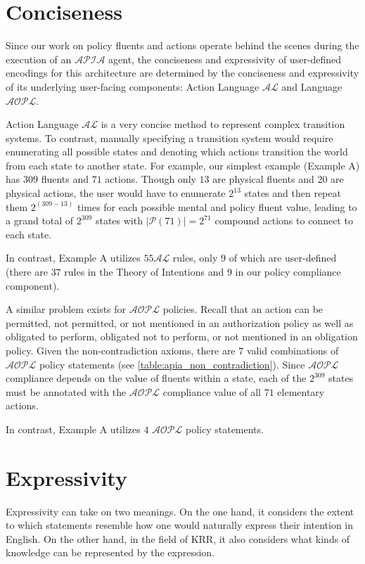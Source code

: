 \section{Conciseness}

Since our work on policy fluents and actions operate behind the scenes during the execution of an $\mathcal{APIA}$ agent, the conciseness and expressivity of user-defined encodings for this architecture are determined by the conciseness and expressivity of its underlying user-facing components: Action Language $\mathcal{AL}$ and Language $\mathcal{AOPL}$.

Action Language $\mathcal{AL}$ is a very concise method to represent complex transition systems.
To contrast, manually specifying a transition system would require enumerating all possible states and denoting which actions transition the world from each state to another state.
For example, our simplest example (Example A) has $309$ fluents and $71$ actions.
Though only $13$ are physical fluents and $20$ are physical actions, the user would have to enumerate $2^{13}$ states and then repeat them $2^{(309-13)}$ times for each possible mental and policy fluent value, leading to a grand total of $2^{309}$ states with $|\mathcal{P}(71)|=2^{71}$ compound actions to connect to each state.

In contrast, Example A utilizes $55$$\mathcal{AL}$ rules, only $9$ of which are user-defined (there are $37$ rules in the Theory of Intentions and $9$ in our policy compliance component).

A similar problem exists for $\mathcal{AOPL}$ policies.
Recall that an action can be permitted, not permitted, or not mentioned in an authorization policy as well as obligated to perform, obligated not to perform, or not mentioned in an obligation policy.
Given the non-contradiction axioms, there are $7$ valid combinations of $\mathcal{AOPL}$ policy statements (see \cref{table:apia_non_contradiction}).
Since $\mathcal{AOPL}$ compliance depends on the value of fluents within a state, each of the $2^{309}$ states must be annotated with the $\mathcal{AOPL}$ compliance value of all $71$ elementary actions.

In contrast, Example A utilizes $4$ $\mathcal{AOPL}$ policy statements.

\section{Expressivity}

Expressivity can take on two meanings.
On the one hand, it considers the extent to which statements resemble how one would naturally express their intention in English.
On the other hand, in the field of KRR, it also considers what kinds of knowledge can be represented by the expression.

